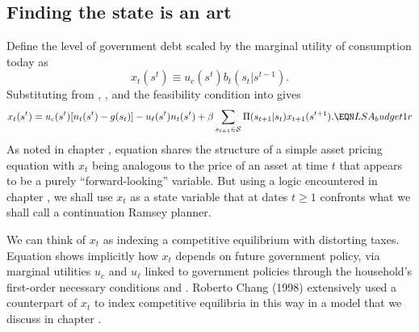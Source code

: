 \subsection{Finding the state is an art}
 Define  the level of government debt
scaled by the marginal utility of consumption  today as
$$ x_t(s^t) \equiv u_c(s^t) b_t(s_t | s^{t-1}). $$
  Substituting from ,  ,  and the feasibility condition 
into  gives
$$   x_t(s^t)  = u_c(s^t) [ n_t(s^t) - g(s_t)]  - u_\ell (s^t) n_t(s^t) + \beta \sum_{s_{t+1}\in {\cal S}} \Pi (s_{t+1}| s_t) x_{t+1}(s^{t+1}).
 \EQN LSA_budget1r $$
 As noted in chapter ,   equation  shares  the structure of
 a simple asset pricing equation with $x_t$ being analogous to the price of an asset at time $t$ that appears to be  a purely ``forward-looking'' variable.
   But using a logic encountered in chapter , we shall use $x_t$ as a state variable
 that at dates $t \geq 1$ confronts what we shall call a continuation Ramsey planner.  %

We can think of $x_t$ as indexing a competitive equilibrium with distorting taxes.  Equation  shows implicitly how $x_t$ depends
on future government policy, via  marginal utilities $u_c$ and $u_\ell$  linked to government policies through the household's first-order necessary
conditions  and . Roberto Chang (1998) extensively used a counterpart of $x_t$ to index competitive equilibria in this way in a model that we
discuss in chapter .
%



